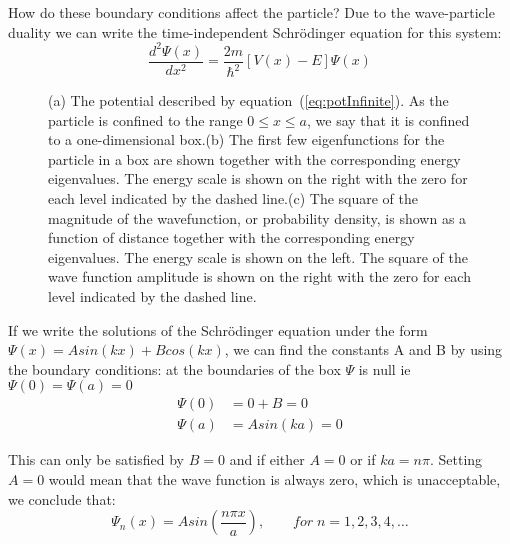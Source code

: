 How do these boundary conditions affect the particle? Due to the wave-particle duality we can write the time-independent Schr\"odinger equation for this system:
\begin{equation}
\frac{d^2 \Psi (x)}{d x^2} = \frac{2 m}{\hbar^2} \left[ V(x) - E\right] \Psi(x)
\label{eq:SchoEqInfinite}
\end{equation}


\begin{figure} 
 \centering

\; 
 \caption{(a) The potential described by equation~(\ref{eq:potInfinite}). As the particle is confined to the range $0\leq x \leq a$, we say that it is confined to a one-dimensional box.\newline (b) The first few eigenfunctions for the particle in a box are shown together with the corresponding energy eigenvalues. The energy scale is shown on the right with the zero for each level indicated by the dashed line.\newline (c) The square of the magnitude of the wavefunction, or probability density, is shown as a function of distance together with the corresponding energy eigenvalues. The energy scale is shown on the left. The square of the wave function amplitude is shown on the right with the zero for each level indicated by the dashed line.}
 \label{fig:InfiniteWell}
\end{figure}


If we write the solutions of the Schr\"odinger equation under the form $\Psi(x) = A sin(kx) + B cos(kx)$, we can find the constants A and B by using the boundary conditions: at the boundaries of the box $\Psi$ is null ie $\Psi(0)=\Psi(a)=0$
\begin{align}
\Psi(0) &= 0 + B = 0 \\
\Psi(a) &= A sin(ka) = 0 \nonumber
\label{eq:conditionsInfinite}
\end{align}

This can only be satisfied by $B=0$ and if either $A=0$ or if $ka=n \pi$. Setting $A=0$ would mean that the wave function is always zero, which is unacceptable, we conclude that:
\begin{equation}
\Psi_n(x) = A sin(\frac{n \pi x}{a}), \qquad for \; n=1,2,3,4,\dots
\label{eq:solutionInfinite}
\end{equation}

